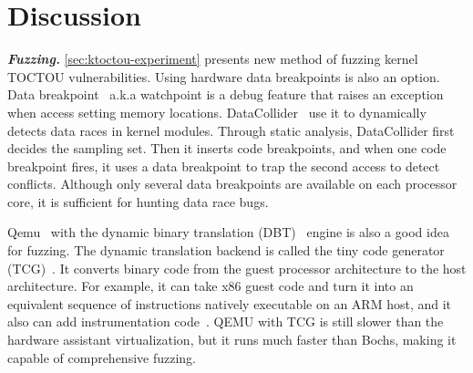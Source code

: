 
\section{Discussion}
\label{sec:ktoctou-discussion}


\textbf{\textit{Fuzzing.}} \autoref{sec:ktoctou-experiment} presents new method of fuzzing kernel TOCTOU vulnerabilities. Using hardware data breakpoints is also an option. Data breakpoint~\cite{krishnan2009hardware} a.k.a watchpoint is a debug feature that raises an exception when access setting memory locations.  DataCollider~\cite{krishnan2009hardware} use it to dynamically detects data races in kernel modules. Through static analysis,  DataCollider first decides the sampling set. Then it inserts code breakpoints, and when one code breakpoint fires, it uses a data breakpoint to trap the second access to detect conflicts. Although only several data breakpoints are available on each processor core, it is sufficient for hunting data race bugs.


Qemu~\cite{bellard2005qemu} with the dynamic binary translation (DBT)~\cite{ebcioglu2001dynamic} engine is also a good idea for fuzzing. The dynamic translation backend is called the tiny code generator (TCG)~\cite{bellard2005qemu}.  It converts binary code from the guest processor architecture to the host architecture. For example, it can take x86 guest code and turn it into an equivalent sequence of instructions natively executable on an ARM host, and it also can add instrumentation code~\cite{quynh2015unicorn}. QEMU with TCG is still slower than the hardware assistant virtualization, but it runs much faster than Bochs, making it capable of comprehensive fuzzing.





